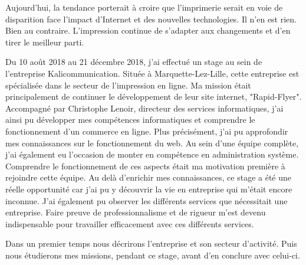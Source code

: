 Aujourd'hui, la tendance porterait à croire que l'imprimerie serait en voie de disparition face l'impact d'Internet et des nouvelles technologies. Il n'en est rien. Bien au contraire. L'impression continue de s'adapter aux changements et d'en tirer le meilleur parti.\newline

Du 10 août 2018 au 21 décembre 2018, j'ai effectué un stage au sein de l'entreprise Kalicommunication.
Située à Marquette-Lez-Lille, cette entreprise est spécialisée dans le secteur de l'impression en ligne.\newline
Ma mission était principalement de continuer le développement de leur site internet, "Rapid-Flyer".
Accompagné par Christophe Lenoir, directeur des services informatiques, j'ai ainsi pu développer mes compétences informatiques et comprendre le fonctionnement d'un commerce en ligne. Plus précisément, j'ai pu approfondir mes connaissances sur le fonctionnement du web. Au sein d'une équipe complète, j'ai également eu l'occasion de monter en compétence en administration système. Comprendre le fonctionnement de ces aspects était ma motivation première à rejoindre cette équipe.\newline
Au delà d'enrichir mes connaissances, ce stage a été une réelle opportunité car j'ai pu y découvrir la vie en entreprise qui m'était encore inconnue. J'ai également pu observer les différents services que nécessitait une entreprise. Faire preuve de professionnalisme et de rigueur m'est devenu indispensable pour travailler efficacement avec ces différents services.\newline

Dans un premier temps nous décrirons l'entreprise et son secteur d'activité. Puis nous étudierons mes missions, pendant ce stage, avant d'en conclure avec celui-ci.